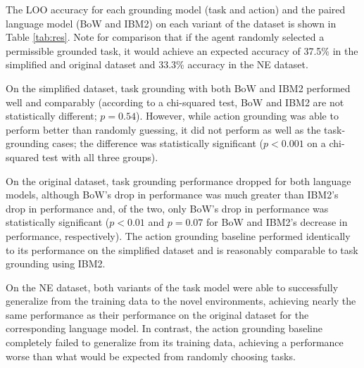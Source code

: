 \documentclass[conference]{IEEEtran}
\begin{document}
The LOO accuracy for each grounding model (task and action) and the paired language model (BoW and IBM2) on each variant of the dataset is shown in Table \ref{tab:res}. Note for comparison that if the agent randomly selected a permissible grounded task, it would achieve an expected accuracy of 37.5\% in the simplified and original dataset and 33.3\% accuracy in the NE dataset. 


On the simplified dataset, task grounding with both BoW and IBM2 performed well and comparably (according to a chi-squared test, BoW and IBM2 are not statistically different; $p = 0.54$). However, while action grounding was able to perform better than randomly guessing, it did not perform as well as the task-grounding cases; the difference was statistically significant ($p < 0.001$ on a chi-squared test with all three groups).

On the original dataset, task grounding performance dropped for both language models, although BoW's drop in performance was much greater than IBM2's drop in performance and, of the two, only BoW's drop in performance was statistically significant ($p < 0.01$ and $p = 0.07$ for BoW and IBM2's decrease in performance, respectively). The action grounding baseline performed identically to its performance on the simplified dataset and is reasonably comparable to task grounding using IBM2.

On the NE dataset, both variants of the task model were able to successfully generalize from the training data to the novel environments, achieving nearly the same performance as their performance on the original dataset for the corresponding language model.
In contrast, the action grounding baseline completely failed to generalize from its training data, achieving a performance worse than what would be expected from randomly choosing tasks.

\end{document}
